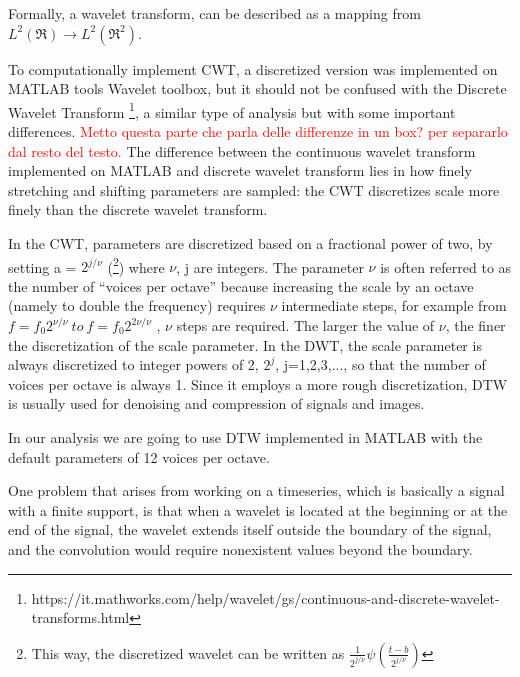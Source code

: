 \documentclass[11pt]{report}
\begin{document}
Formally, a wavelet transform, can be described as a mapping from $L^2(\Re) \rightarrow L^2(\Re^2)$.

To computationally implement CWT, a discretized version was implemented on MATLAB tools Wavelet toolbox, but it should not be confused with the Discrete Wavelet Transform \footnote{https://it.mathworks.com/help/wavelet/gs/continuous-and-discrete-wavelet-transforms.html}, a similar type of analysis but with some important differences.
\textcolor{red}{Metto questa parte che parla delle differenze in un box? per separarlo dal resto del testo. }
The difference between the continuous wavelet transform implemented on MATLAB and discrete wavelet transform lies in how finely stretching and shifting parameters are sampled: the CWT discretizes scale more finely than the discrete wavelet transform.

In the CWT, parameters are discretized based on a fractional power of two, by setting a = $2^{j/\nu}$  (\footnote{This way, the discretized wavelet can be written as $\frac{1}{2^{j/\nu}} \psi\left ( \frac{t-b}{2^{j/\nu}}\right )$ }) \cite{liu-1994} \cite{dabauchies-1992} where $\nu $, j are integers.
The parameter $\nu$ is often referred to as the number of “voices per octave” because increasing the scale by an octave (namely to double the frequency) requires $\nu$ intermediate steps, for example from $f = f_0 2^{\nu/\nu} \ to \ f = f_0 2^{2\nu/\nu}$ , $\nu$ steps are required.
The larger the value of $\nu$, the finer the discretization of the scale parameter.
In the DWT, the scale parameter is always discretized to integer powers of 2, $2^j$, j=1,2,3,..., so that the number of voices per octave is always 1.
Since it employs a more rough discretization, DTW is usually used for denoising and compression of signals and images.

In our analysis we are going to use DTW implemented in MATLAB with the default parameters of 12 voices per octave.


One problem that arises from working on a timeseries, which is basically a signal with a finite support, is that when a wavelet is located at the beginning or at the end of the signal, the wavelet extends itself outside the boundary of the signal, and the convolution would require nonexistent values beyond the boundary.
\end{document}
